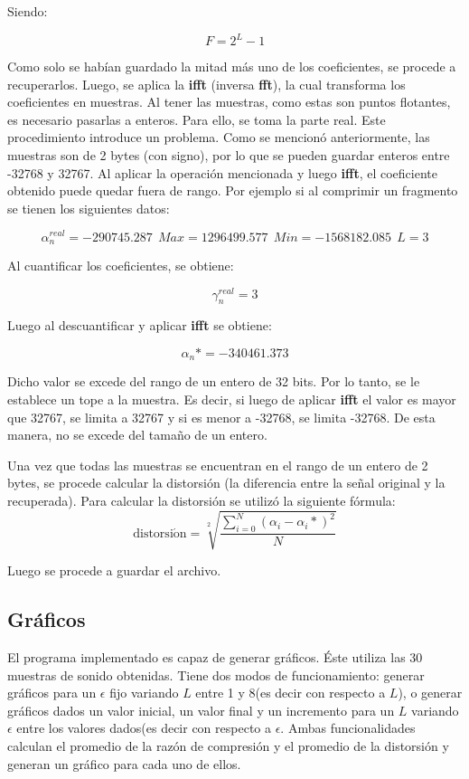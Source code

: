\documentclass[12pt,a4paper]{article}
\begin{document}
	Siendo:
      
$$F = 2^L - 1$$
      
      Como solo se habían guardado la mitad más uno de los coeficientes, se procede a recuperarlos. Luego, se aplica la \textbf{ifft} (inversa \textbf{fft}), la cual transforma los coeficientes en muestras. Al tener las muestras, como estas son puntos flotantes, es necesario pasarlas a enteros. Para ello, se toma la parte real.
      Este procedimiento introduce un problema. Como se mencionó anteriormente, las muestras son de 2 bytes (con signo), por lo que se pueden guardar enteros entre -32768 y 32767. Al aplicar la operación mencionada y luego \textbf{ifft}, el coeficiente obtenido puede quedar fuera de rango. Por ejemplo si al comprimir un fragmento se tienen los siguientes datos:
      
$$\alpha^{real}_n = -290745.287 \:\: Max = 1296499.577 \:\: Min = -1568182.085 \:\: L = 3$$
      
	Al cuantificar los coeficientes, se obtiene:
    
$$\gamma^{real}_n = 3 $$ 
    
    Luego al descuantificar y aplicar \textbf{ifft} se obtiene:
    
$$\alpha_n* = -340461.373 $$

	Dicho valor se excede del rango de un entero de 32 bits. Por lo tanto, se le establece un tope a la muestra. Es decir, si luego de aplicar \textbf{ifft} el valor es mayor que 32767, se limita a 32767  y si es menor a -32768, se limita -32768. De esta manera, no se excede del tamaño de un entero. 
    
    Una vez que todas las muestras se encuentran en el rango de un entero de 2 bytes, se procede calcular la distorsión (la diferencia entre la señal original y la recuperada). Para calcular la distorsión se utilizó la siguiente fórmula:
    $$\mathrm{distorsi\acute{o}n} = \sqrt[2]{\frac{\sum_{i=0}^{N}(\alpha_{i} - \alpha_{i}* )^2}{N}}$$
    
    Luego se procede a guardar el archivo.
    
\subsection{Gráficos}

 	El programa implementado es capaz de generar gráficos. Éste utiliza las 30 muestras de sonido obtenidas. Tiene dos modos de funcionamiento: generar gráficos para un $\epsilon$ fijo variando $L$ entre 1 y 8(es decir con respecto a $L$), o generar gráficos dados un valor inicial, un valor final y un incremento para un $L$ variando $\epsilon$ entre los valores dados(es decir con respecto a $\epsilon$. Ambas funcionalidades calculan el promedio de la razón de compresión y el promedio de la distorsión y generan un gráfico para cada uno de ellos.
    
\end{document}
